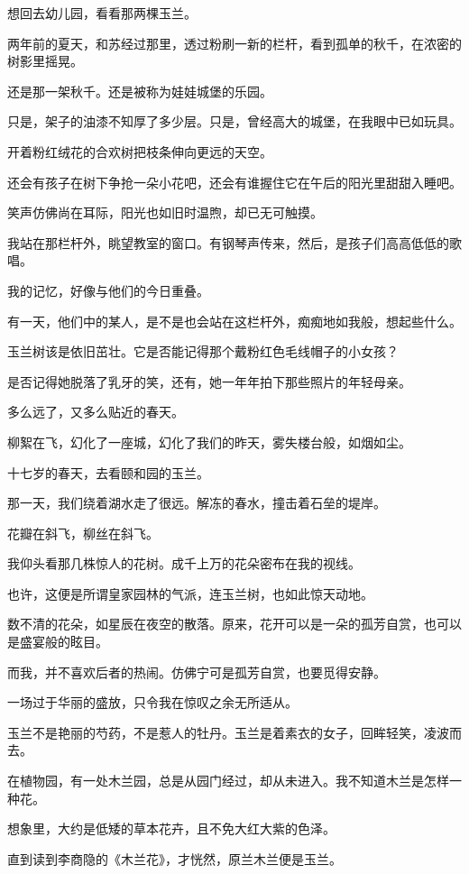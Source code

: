 		\vspace{1em}
		想回去幼儿园，看看那两棵玉兰。\par
		两年前的夏天，和苏经过那里，透过粉刷一新的栏杆，看到孤单的秋千，在浓密的树影里摇晃。\par
		还是那一架秋千。还是被称为娃娃城堡的乐园。\par
		只是，架子的油漆不知厚了多少层。只是，曾经高大的城堡，在我眼中已如玩具。\par
		开着粉红绒花的合欢树把枝条伸向更远的天空。\par
		还会有孩子在树下争抢一朵小花吧，还会有谁握住它在午后的阳光里甜甜入睡吧。\par
		笑声仿佛尚在耳际，阳光也如旧时温煦，却已无可触摸。\par
		我站在那栏杆外，眺望教室的窗口。有钢琴声传来，然后，是孩子们高高低低的歌唱。\par
		我的记忆，好像与他们的今日重叠。\par
		有一天，他们中的某人，是不是也会站在这栏杆外，痴痴地如我般，想起些什么。\par
		玉兰树该是依旧茁壮。它是否能记得那个戴粉红色毛线帽子的小女孩？\par
		是否记得她脱落了乳牙的笑，还有，她一年年拍下那些照片的年轻母亲。\par
		多么远了，又多么贴近的春天。\par
		柳絮在飞，幻化了一座城，幻化了我们的昨天，雾失楼台般，如烟如尘。

		\vspace{1em}
		十七岁的春天，去看颐和园的玉兰。\par
		那一天，我们绕着湖水走了很远。解冻的春水，撞击着石垒的堤岸。\par
		花瓣在斜飞，柳丝在斜飞。\par
		我仰头看那几株惊人的花树。成千上万的花朵密布在我的视线。\par
		也许，这便是所谓皇家园林的气派，连玉兰树，也如此惊天动地。\par
		数不清的花朵，如星辰在夜空的散落。原来，花开可以是一朵的孤芳自赏，也可以是盛宴般的眩目。\par
		而我，并不喜欢后者的热闹。仿佛宁可是孤芳自赏，也要觅得安静。\par
		一场过于华丽的盛放，只令我在惊叹之余无所适从。\par
		玉兰不是艳丽的芍药，不是惹人的牡丹。玉兰是着素衣的女子，回眸轻笑，凌波而去。\par
		在植物园，有一处木兰园，总是从园门经过，却从未进入。我不知道木兰是怎样一种花。\par
		想象里，大约是低矮的草本花卉，且不免大红大紫的色泽。\par
		直到读到李商隐的《木兰花》，才恍然，原兰木兰便是玉兰。

